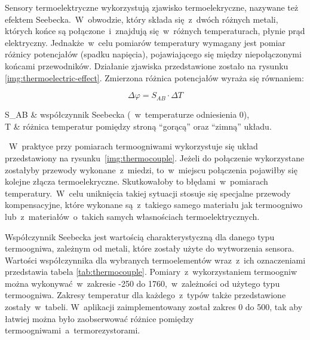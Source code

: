 Sensory termoelektryczne wykorzystują zjawisko termoelekryczne, nazywane też efektem
Seebecka.~W~obwodzie, który składa się~z~dwóch różnych metali, których końce są połączone~i~znajdują
się~w~różnych temperaturach, płynie prąd elektryczny. Jednakże~w~celu pomiarów temperatury wymagany
jest pomiar różnicy potencjałów (spadku napięcia), pojawiającego się między niepołączonymi końcami
przewodników. Działanie zjawiska przedstawione zostało na rysunku \ref{img:thermoelectric-effect}.
Zmierzona różnica potencjałów wyraża się równaniem:

\begin{equation}\label{eqn:voltage-thermocouple}
  \Delta \varphi = S_{AB}\cdot\Delta T
\end{equation}

\begin{eqparams}
  S_{AB} & współczynnik Seebecka (~w~temperaturze odniesienia 0\degC), \\
  \Delta T & różnica temperatur pomiędzy stroną \enquote{gorącą} oraz \enquote{zimną} układu.
\end{eqparams}

 ~W~praktyce przy pomiarach termoogniwami wykorzystuje się
układ przedstawiony na rysunku~\ref{img:thermocouple}. Jeżeli do połączenie wykorzystane zostałyby
przewody wykonane~z~miedzi, to~w~miejscu połączenia pojawiłby się kolejne złącza termoelekryczne.
Skutkowałoby to błędami~w~pomiarach temperatury.~W~celu uniknięcia takiej sytuacji stosuje się
specjalne przewody kompensacyjne, które wykonane są~z~takiego samego materiału jak termoogniwo
lub~z~materiałów~o~takich samych własnościach termoelektrycznych.


Współczynnik Seebecka jest wartością charakterystyczną dla danego typu termoogniwa, zależnym od
metali, które zostały użyte do wytworzenia sensora. Wartości współczynnika \cite{thermocouple} dla
wybranych termoelementów wraz~z~ich oznaczeniami przedstawia tabela \ref{tab:thermocouple}.
Pomiary~z~wykorzystaniem termoogniw można wykonywać~w~zakresie -250 do 1760\degC,~w~zależności od
użytego typu termoogniwa. Zakresy temperatur dla każdego~z~typów także przedstawione
zostały~w~tabeli. W~aplikacji zaimplementowany został zakres 0 do 500\degC, tak aby łatwiej można
było zaobserwować różnice pomiędzy termoogniwami~a~termorezystorami.

